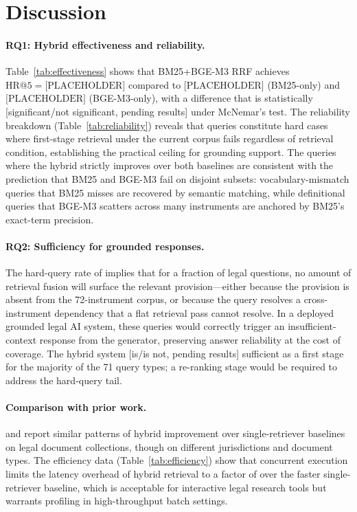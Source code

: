 \documentclass{iosart2x}
\makeatletter
\newcommand{\HR}[1]{\text{HR}@{#1}}
\newcommand{\PH}{\text{[PLACEHOLDER]}\xspace}
\newcommand{\bgem}{BGE-M3\xspace}
\newcommand{\rrf}{RRF\xspace}
\makeatother
\begin{document}
\section{Discussion}
\label{sec:discussion}

\paragraph{RQ1: Hybrid effectiveness and reliability.}
Table~\ref{tab:effectiveness} shows that BM25+\bgem{} \rrf achieves
$\HR{5}{=}\PH$ compared to $\PH$ (BM25-only) and $\PH$ (\bgem-only),
with a difference that is statistically [significant/not significant,
pending results] under McNemar's test.  The reliability breakdown
(Table~\ref{tab:reliability}) reveals that \PH{} queries constitute
hard cases where first-stage retrieval under the current corpus fails
regardless of retrieval condition, establishing the practical ceiling
for grounding support.  The \PH{} queries where the hybrid strictly
improves over both baselines are consistent with the prediction that
BM25 and \bgem{} fail on disjoint subsets: vocabulary-mismatch queries
that BM25 misses are recovered by semantic matching, while
definitional queries that \bgem{} scatters across many instruments are
anchored by BM25's exact-term precision.

\paragraph{RQ2: Sufficiency for grounded responses.}
The hard-query rate of \PH{} implies that for a fraction of legal
questions, no amount of retrieval fusion will surface the relevant
provision---either because the provision is absent from the 72-instrument
corpus, or because the query resolves a cross-instrument dependency
that a flat retrieval pass cannot resolve.  In a deployed grounded
legal AI system, these queries would correctly trigger an
insufficient-context response from the generator, preserving
answer reliability at the cost of coverage.  The hybrid system
[is/is not, pending results] sufficient as a first stage for
the majority of the 71 query types; a re-ranking stage would be
required to address the hard-query tail.

\paragraph{Comparison with prior work.}
\citet{lrage2024} and \citet{hyparag2024} report similar patterns of
hybrid improvement over single-retriever baselines on legal document
collections, though on different jurisdictions and document types.
The efficiency data (Table~\ref{tab:efficiency}) show that concurrent
execution limits the latency overhead of hybrid retrieval to a factor
of \PH{}over the faster single-retriever baseline, which is acceptable
for interactive legal research tools but warrants profiling in
high-throughput batch settings.
\end{document}
